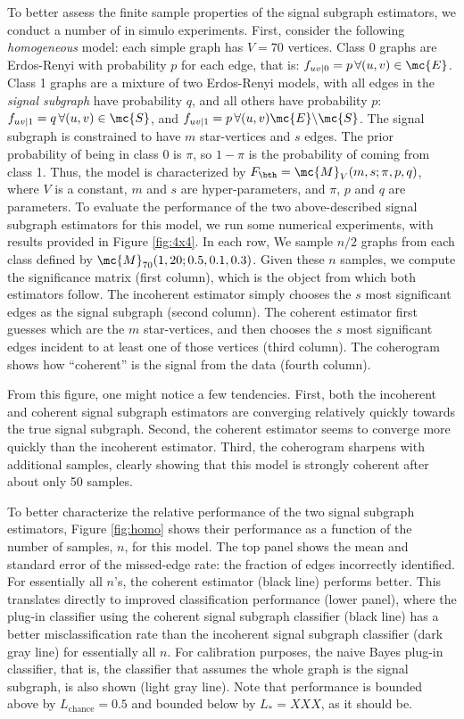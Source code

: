 \documentclass[10pt,journal,cspaper,compsoc]{IEEEtran}
\begin{document}
To better assess the finite sample properties of the signal subgraph estimators, we conduct a number of in simulo experiments.  First, consider the following \emph{homogeneous} model: each simple graph has $V=70$ vertices.  Class 0 graphs are Erdos-Renyi with probability $p$ for each edge, that is: $f_{uv|0}=p \, \forall (u,v) \in \mc{E}$.  Class 1 graphs are a mixture of two Erdos-Renyi models, with all edges in the \emph{signal subgraph} have probability $q$, and all others have probability $p$: $f_{uv|1}=q \, \forall (u,v) \in \mc{S}$, and $f_{uv|1}=p \, \forall (u,v) \mc{E} \backslash \mc{S}$.  The signal subgraph is constrained to have $m$ star-vertices and $s$ edges.  The prior probability of being in class 0 is $\pi$, so $1-\pi$ is the probability of coming from class 1. Thus, the model is characterized by $F_{\bth}=\mc{M}_V(m,s; \pi,p,q)$, where $V$ is a constant, $m$ and $s$ are hyper-parameters, and $\pi$, $p$ and $q$ are parameters.  To evaluate the performance of the two above-described signal subgraph estimators for this model, we run some numerical experiments, with results provided in Figure \ref{fig:4x4}.  In each row, We sample $n/2$ graphs from each class defined by $\mc{M}_{70}(1,20;0.5,0.1,0.3)$.  Given these $n$ samples, we compute the significance matrix (first column), which is the object from which both estimators follow.  The incoherent estimator simply chooses the $s$ most significant edges as the signal subgraph (second column). The coherent estimator first guesses which are  the $m$ star-vertices, and then chooses the $s$ most significant edges incident to at least one of those vertices (third column).  The coherogram shows how ``coherent'' is the signal from the data (fourth column).    

From this figure, one might notice a few tendencies.  First, both the incoherent and coherent signal subgraph estimators are converging relatively quickly towards the true signal subgraph.  Second, the coherent estimator seems to converge more quickly than the incoherent estimator.  Third, the coherogram sharpens with additional samples, clearly showing that this model is strongly coherent after about only 50 samples.


To better characterize the relative performance of the two signal subgraph estimators, Figure \ref{fig:homo} shows their performance as a function of the number of samples, $n$, for this model.  The top panel shows the mean and standard error of the missed-edge rate: the fraction of edges incorrectly identified.  For essentially all $n$'s, the coherent estimator (black line) performs better.  This translates directly to improved classification performance (lower panel), where the plug-in classifier using the coherent signal subgraph classifier (black line) has a better misclassification rate than the incoherent signal subgraph classifier (dark gray line) for essentially all $n$.  For calibration purposes, the naive Bayes plug-in classifier, that is, the classifier that assumes the whole graph is the signal subgraph, is also shown (light gray line).  Note that performance is bounded above by $L_{\text{chance}}=0.5$ and bounded below by $L_*=XXX$, as it should be.    
\end{document}
